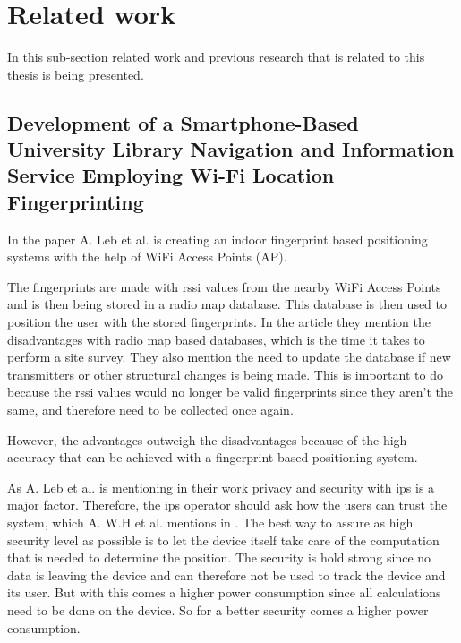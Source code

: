 \section{Related work}\label{sec:theoryRelatedWork}
In this sub-section related work and previous research that is related to this thesis is being presented.


\subsection{Development of a Smartphone-Based University Library Navigation and Information Service Employing Wi-Fi Location Fingerprinting}\label{sec:}
In the paper \cite{DevelopmentSmartphoneBasedUniversity2021} A. Leb et al. is creating an indoor fingerprint based positioning systems with the help of WiFi Access Points (AP).

\bigskip

The fingerprints are made with \acrshort{rssi} values from the nearby WiFi Access Points and is then being stored in a radio map database.
This database is then used to position the user with the stored fingerprints.
In the article they mention the disadvantages with radio map based databases, which is the time it takes to perform a site survey.
They also mention the need to update the database if new transmitters or other structural changes is being made.
This is important to do because the \acrshort{rssi} values would no longer be valid fingerprints since they aren't the same, and therefore need to be collected once again.

\bigskip

However, the advantages outweigh the disadvantages because of the high accuracy that can be achieved with a fingerprint based positioning system.

\bigskip

As A. Leb et al. is mentioning in their work privacy and security with \acrfull{ips} is a major factor.
Therefore, the \acrshort{ips} operator should ask how the users can trust the system, which A. W.H et al. mentions in \cite{SurveyWirelessIndoor2019}.
The best way to assure as high security level as possible is to let the device itself take care of the computation that is needed to determine the position.
The security is hold strong since no data is leaving the device and can therefore not be used to track the device and its user.
But with this comes a higher power consumption since all calculations need to be done on the device.
So for a better security comes a higher power consumption.

